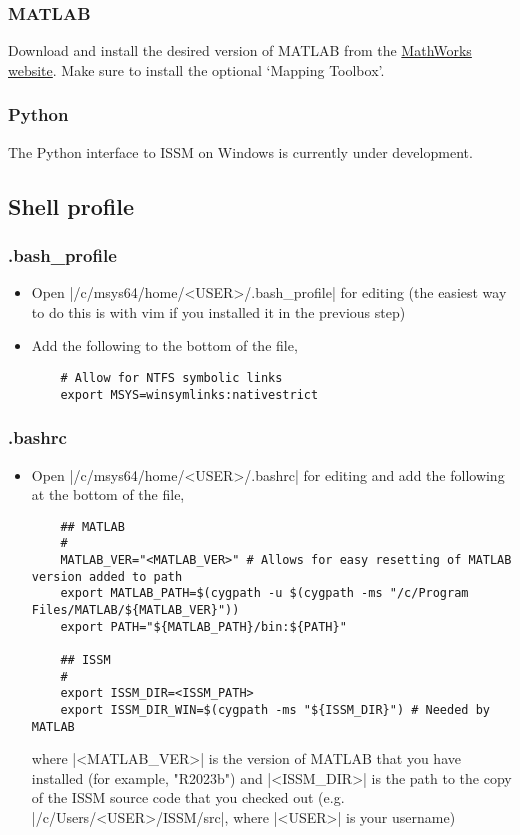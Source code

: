 \subsubsection{MATLAB}
Download and install the desired version of MATLAB from the \href{https://www.mathworks.com}{MathWorks website}. Make sure to install the optional `Mapping Toolbox'.

\subsubsection{Python}
The Python interface to ISSM on Windows is currently under development.

\subsection{Shell profile}
\subsubsection{.bash\_profile}
\begin{itemize}
	\item Open \lstinlinebg|/c/msys64/home/<USER>/.bash_profile| for editing (the easiest way to do this is with vim if you installed it in the previous step)
	\item Add the following to the bottom of the file,

	\begin{lstlisting}
	# Allow for NTFS symbolic links
	export MSYS=winsymlinks:nativestrict
	\end{lstlisting}
\end{itemize}

\subsubsection{.bashrc}
\begin{itemize}
	\item Open \lstinlinebg|/c/msys64/home/<USER>/.bashrc| for editing and add the following at the bottom of the file, 

	\begin{lstlisting}
	## MATLAB
	#
	MATLAB_VER="<MATLAB_VER>" # Allows for easy resetting of MATLAB version added to path
	export MATLAB_PATH=$(cygpath -u $(cygpath -ms "/c/Program Files/MATLAB/${MATLAB_VER}"))
	export PATH="${MATLAB_PATH}/bin:${PATH}"

	## ISSM
	#
	export ISSM_DIR=<ISSM_PATH>
	export ISSM_DIR_WIN=$(cygpath -ms "${ISSM_DIR}") # Needed by MATLAB
	\end{lstlisting}

	where \lstinlinebg|<MATLAB_VER>| is the version of MATLAB that you have installed (for example, "R2023b") and \lstinlinebg|<ISSM_DIR>| is the path to the copy of the ISSM source code that you checked out (e.g. \lstinlinebg|/c/Users/<USER>/ISSM/src|, where \lstinlinebg|<USER>| is your username)
\end{itemize}
